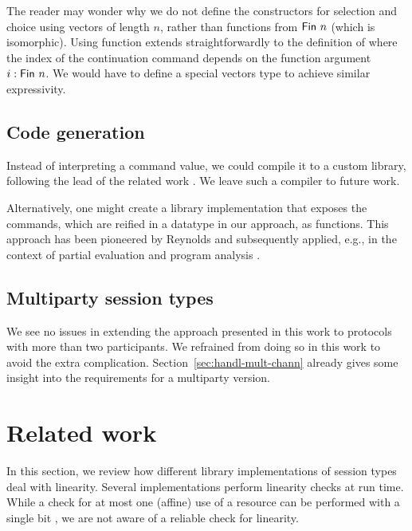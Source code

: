 \documentclass[acmsmall,screen,anonymous,review]{acmart}
\begin{document}
The reader may wonder why we do not define the constructors for
selection and choice using vectors of length $n$, rather than
functions from $\AFin~n$ (which is isomorphic). Using function extends
straightforwardly to the definition of {\ACommand} where the {\ASession} index of the
continuation command depends on the function argument $i : \AFin~n$.
We would have to define a special vectors type to achieve similar
expressivity. 

\subsection{Code generation}
\label{sec:code-generation}

Instead of interpreting a command value, we could compile it to a
custom library, following the lead of the related work
\cite{DBLP:journals/pacmpl/00020HNY20,DBLP:conf/cc/Miu0Y021}.
We leave such a compiler to future work.

Alternatively, one might create a library implementation that exposes
the commands, which are reified in a datatype in our approach, as
functions. This approach has been pioneered by Reynolds and
subsequently applied, e.g., in the context of partial evaluation and
program analysis \cite{DBLP:journals/jfp/Thiemann99,DBLP:journals/jfp/CaretteKS09}.

\subsection{Multiparty session types}
\label{sec:mult-sess-types}

We see no issues in extending the approach presented in this work to
protocols with more than two participants. We refrained from doing so
in this work to avoid the extra
complication. Section~\ref{sec:handl-mult-chann} already gives some
insight into the requirements for a multiparty version.

\section{Related work}
\label{sec:related-work}

In this section, we review how different library implementations of
session types deal with linearity. Several implementations perform
linearity checks at run time. While a check for at most one (affine)
use of a resource can be performed with a single bit \cite{DBLP:conf/esop/TovP10}, we
are not aware of a reliable check for linearity.
\end{document}

